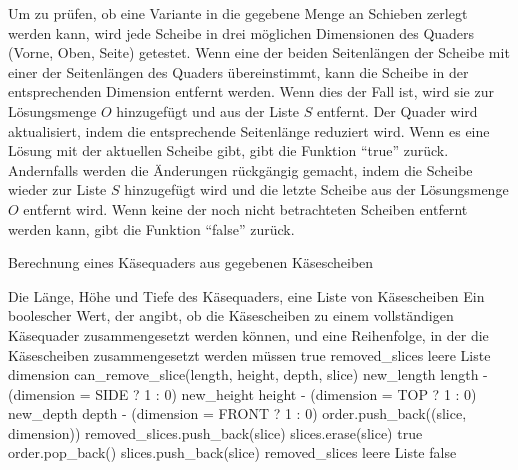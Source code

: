 \documentclass[a4paper,10pt,ngerman]{scrartcl}
\begin{document}
    Um zu prüfen, ob eine Variante in die gegebene Menge an Schieben zerlegt werden kann, wird jede
    Scheibe in drei möglichen Dimensionen des Quaders (Vorne, Oben, Seite) getestet.
    Wenn eine der beiden Seitenlängen der Scheibe mit einer der Seitenlängen des Quaders übereinstimmt,
    kann die Scheibe in der entsprechenden Dimension entfernt werden.
    Wenn dies der Fall ist, wird sie zur Lösungsmenge $O$ hinzugefügt und aus der Liste $S$ entfernt.
    Der Quader wird aktualisiert, indem die entsprechende Seitenlänge reduziert wird.
    Wenn es eine Lösung mit der aktuellen Scheibe gibt, gibt die Funktion ``true'' zurück.
    Andernfalls werden die Änderungen rückgängig gemacht, indem die Scheibe wieder zur Liste $S$ hinzugefügt wird
    und die letzte Scheibe aus der Lösungsmenge $O$ entfernt wird.
    Wenn keine der noch nicht betrachteten Scheiben entfernt werden kann, gibt die Funktion ``false'' zurück.

    \begin{algorithm}
        \caption{Berechnung eines Käsequaders aus gegebenen Käsescheiben}
        \label{alg:cheese}
        \begin{algorithmic}
            \Require Die Länge, Höhe und Tiefe des Käsequaders, eine Liste von Käsescheiben
            \Ensure Ein boolescher Wert, der angibt, ob die Käsescheiben zu einem vollständigen Käsequader zusammengesetzt werden können,
            und eine Reihenfolge, in der die Käsescheiben zusammengesetzt werden müssen
                    \State \Return true
                \EndIf
                \State removed\_slices \gets leere Liste
                    \State dimension \gets can\_remove\_slice(length, height, depth, slice)
                        \State new\_length \gets length - (dimension = SIDE ? 1 : 0)
                        \State new\_height \gets height - (dimension = TOP ? 1 : 0)
                        \State new\_depth \gets depth - (dimension = FRONT ? 1 : 0)
                        \State order.push\_back((slice, dimension))
                        \State removed\_slices.push\_back(slice)
                        \State slices.erase(slice)
                            \State \Return true
                        \Else
                            \State order.pop\_back()
                                \State slices.push\_back(slice)
                            \EndFor
                            \State removed\_slices \gets leere Liste
                        \EndElse
                    \EndIf
                \EndFor
                \State \Return false
            \EndFunction
        \end{algorithmic}
    \end{algorithm}
\end{document}
